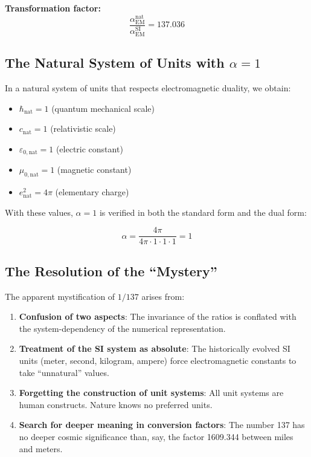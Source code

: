 \documentclass[12pt,a4paper]{article}
\begin{document}
\textbf{Transformation factor:}
\begin{equation}
	\frac{\alpha_{\text{EM}}^{\text{nat}}}{\alpha_{\text{EM}}^{\text{SI}}} = 137.036
\end{equation}

\subsection{The Natural System of Units with $\alpha = 1$}
\label{subsec:natural_units}

In a natural system of units that respects electromagnetic duality, we obtain:

\begin{itemize}
	\item $\hbar_{\text{nat}} = 1$ (quantum mechanical scale)
	\item $c_{\text{nat}} = 1$ (relativistic scale)
	\item $\varepsilon_{0,\text{nat}} = 1$ (electric constant)
	\item $\mu_{0,\text{nat}} = 1$ (magnetic constant)
	\item $e_{\text{nat}}^2 = 4\pi$ (elementary charge)
\end{itemize}

With these values, $\alpha = 1$ is verified in both the standard form and the dual form:

\begin{equation}
	\alpha = \frac{4\pi}{4\pi \cdot 1 \cdot 1 \cdot 1} = 1
\end{equation}

\subsection{The Resolution of the ``Mystery''}
\label{subsec:mystery_resolution}

The apparent mystification of $1/137$ arises from:

\begin{enumerate}
	\item \textbf{Confusion of two aspects}: The invariance of the ratios is conflated with the system-dependency of the numerical representation.
	
	\item \textbf{Treatment of the SI system as absolute}: The historically evolved SI units (meter, second, kilogram, ampere) force electromagnetic constants to take ``unnatural'' values.
	
	\item \textbf{Forgetting the construction of unit systems}: All unit systems are human constructs. Nature knows no preferred units.
	
	\item \textbf{Search for deeper meaning in conversion factors}: The number 137 has no deeper cosmic significance than, say, the factor 1609.344 between miles and meters.
\end{enumerate}
\end{document}
